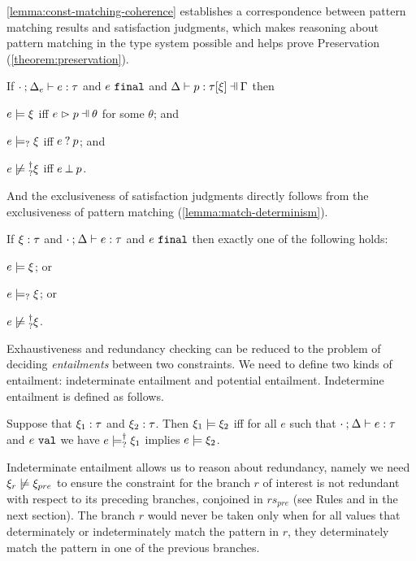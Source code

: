 \autoref{lemma:const-matching-coherence} establishes a correspondence
between pattern matching results and satisfaction judgments, which makes
reasoning about pattern matching in the type system possible and helps prove Preservation (\autoref{theorem:preservation}).

\begin{lemma}
  \label{lemma:const-matching-coherence}
  If $\cdot \mathbin{;} \Delta_e \vdash e : \tau$ and $e ~\mathtt{final}$ and $\chpattyp{p}{\tau}{\xi}{\Gamma}{\Delta}$ then
  \begin{enumerate*}
  \item $e \models \xi$ iff $\hpatmatch{e}{p}{\theta}$ for some $\theta$; and 
  \item $e \models_{?} \xi$ iff $e \mathbin{?} p$; and 
  \item $\cnotsatisfyormay{e}{\xi}$ iff $e \mathbin{\bot} p$.
  \end{enumerate*}
\end{lemma}

And the exclusiveness of satisfaction judgments directly follows from the exclusiveness of pattern matching (\autoref{lemma:match-determinism}).
\begin{theorem}
  \label{theorem:exclusive-constraint-satisfaction}
  If $\xi : \tau$ and $\cdot \mathbin{;} \Delta \vdash e : \tau$ and $e ~\mathtt{final}$ then exactly one of the following holds:
  \begin{enumerate*}
  \item $e \models \xi$; or
  \item $e \models_{?} \xi$; or 
  \item $\cnotsatisfyormay{e}{\xi}$.
  \end{enumerate*}
\end{theorem}

Exhaustiveness and redundancy checking can be reduced to the problem of deciding \emph{entailments} between two constraints. We need to define two kinds of entailment: indeterminate entailment and potential entailment.
Indetermine entailment is defined as follows.
\begin{definition}
  \label{definition:const-entailment}
  Suppose that $\xi_1 : \tau$ and $\xi_2 : \tau$.
  Then $\xi_1 \models \xi_2$ iff for all $e$ such that $\cdot \mathbin{;} \Delta \vdash e : \tau$ and $e ~\mathtt{val}$ we have $e \models_{?}^{\dag} \xi_1$ implies $e \models \xi_2$.
\end{definition}
Indeterminate entailment allows us to reason about redundancy, namely we need $\cnotsatisfy{\xi_r}{\xi_{pre}}$ to ensure the constraint for the branch $r$ of interest is not redundant with respect to its preceding branches, conjoined in $rs_{pre}$ (see Rules \TOneRules and \TRules in the next section).
The branch $r$ would never be taken only when for all values that determinately or indeterminately match the pattern in $r$, they determinately match the pattern in one of the previous branches.



